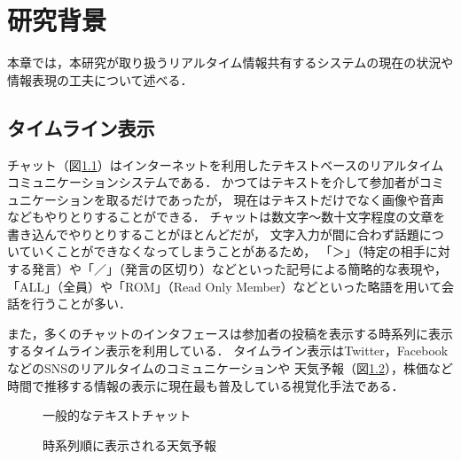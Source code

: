 \chapter{研究背景}
\label{chap:background}

本章では，本研究が取り扱うリアルタイム情報共有するシステムの現在の状況や情報表現の工夫について述べる．

\newpage

\section{タイムライン表示}

チャット（図\ref{chat}）はインターネットを利用したテキストベースのリアルタイムコミュニケーションシステムである．
かつてはテキストを介して参加者がコミュニケーションを取るだけであったが，
現在はテキストだけでなく画像や音声などもやりとりすることができる．
チャットは数文字〜数十文字程度の文章を書き込んでやりとりすることがほとんどだが，
文字入力が間に合わず話題についていくことができなくなってしまうことがあるため，
「＞」（特定の相手に対する発言）や「／」（発言の区切り）などといった記号による簡略的な表現や，
「ALL」（全員）や「ROM」（Read Only Member）などといった略語を用いて会話を行うことが多い．

また，多くのチャットのインタフェースは参加者の投稿を表示する時系列に表示するタイムライン表示を利用している．
タイムライン表示はTwitter，FacebookなどのSNSのリアルタイムのコミュニケーションや
天気予報（図\ref{weather}），株価など時間で推移する情報の表示に現在最も普及している視覚化手法である．

\begin{figure}[H]
\centering
{}
\caption{一般的なテキストチャット}
\label{chat}
\end{figure}

\begin{figure}[H]
\centering
{}
\caption{時系列順に表示される天気予報}
\label{weather}
\end{figure}

